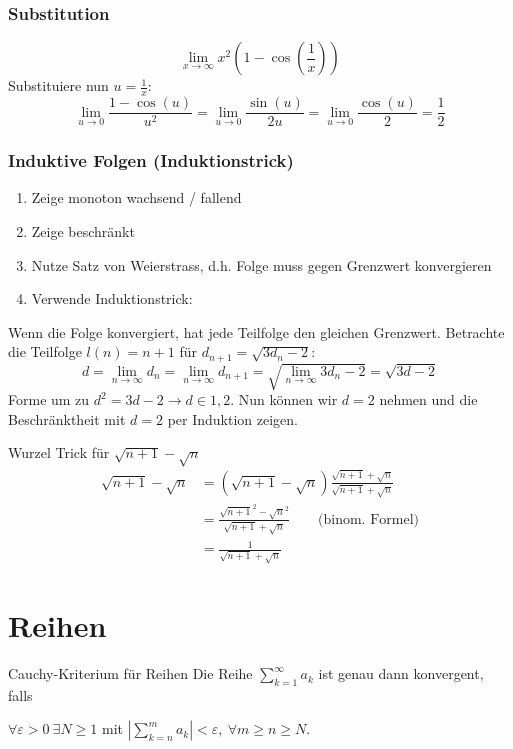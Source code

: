 \documentclass[a4paper,10pt]{article}
\def\sumk{\sum_{k=1}^\infty}
\begin{document}
\subsubsection{Substitution}
$$\lim_{x\to\infty} x^2 \left(1-\cos\left(\frac{1}{x}\right)\right)$$
Substituiere nun $u = \frac{1}{x}$:
$$\lim_{u \to 0} \frac{1 - \cos(u)}{u^2} = \lim_{u \to 0} \frac{\sin(u)}{2u} = \lim_{u\to 0} \frac{\cos(u)}{2} = \frac{1}{2}$$

\subsubsection{Induktive Folgen (Induktionstrick)}
\begin{enumerate}
	\item Zeige monoton wachsend / fallend
	\item Zeige beschränkt
	\item Nutze Satz von Weierstrass, d.h. Folge muss gegen Grenzwert konvergieren
	\item Verwende Induktionstrick:
\end{enumerate}
Wenn die Folge konvergiert, hat jede Teilfolge den gleichen Grenzwert. Betrachte die Teilfolge $l(n) = n + 1$ für $d_{n+1} = \sqrt{3d_n - 2}$:
$$d = \lim_{n\to\infty} d_n = \lim_{n\to\infty} d_{n+1} = \sqrt{\lim_{n \to \infty} 3d_n -2} = \sqrt{3d -2}$$
Forme um zu $ d^2 = 3d -2 \to d \in {1,2}$. Nun können wir $d = 2$ nehmen und die Beschränktheit mit $d=2$ per Induktion zeigen.\\

\begin{subbox}{Wurzel Trick für $\sqrt{n+1}-\sqrt{n}$}
	\begin{align*}
		\sqrt{n+1}-\sqrt{n} & =(\sqrt{n+1}-\sqrt{n})\frac{\sqrt{n+1}+\sqrt{n}}{\sqrt{n+1}+\sqrt{n}}              \\
		                    & =\frac{\sqrt{n+1}^2-\sqrt{n}^2}{\sqrt{n+1}+\sqrt{n}} \qquad \text{(binom. Formel)} \\
		                    & =\frac{1}{\sqrt{n+1}+\sqrt{n}}                                                     
	\end{align*}
\end{subbox}
\section{Reihen}

\begin{mainbox}{Cauchy-Kriterium für Reihen}
	Die Reihe $\sumk a_k$ ist genau dann konvergent, falls 
	\centerline{$\forall \varepsilon > 0 \ \exists N \ge 1$ mit $| \sum_{k=n}^m a_k | < \varepsilon, \ \forall m \ge n \ge N$.}
\end{mainbox}
\end{document}

